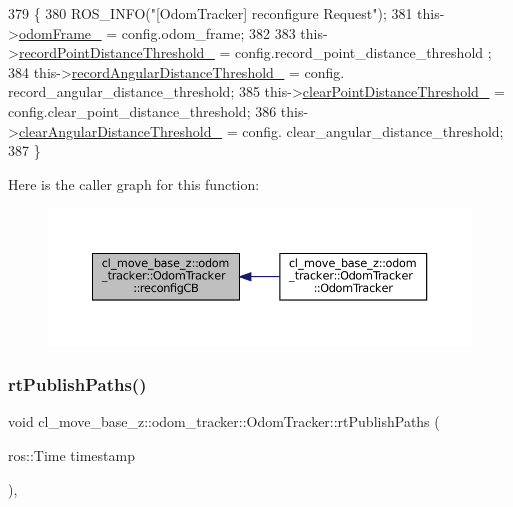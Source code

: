 \begin{DoxyCode}
379 \{
380   ROS\_INFO(\textcolor{stringliteral}{"[OdomTracker] reconfigure Request"});
381   this->\hyperlink{classcl__move__base__z_1_1odom__tracker_1_1OdomTracker_a54f31af5e74006560d94f266297853d4}{odomFrame\_} = config.odom\_frame;
382 
383   this->\hyperlink{classcl__move__base__z_1_1odom__tracker_1_1OdomTracker_a3a1173716d527bd182d04656491e01dd}{recordPointDistanceThreshold\_} = config.record\_point\_distance\_threshold
      ;
384   this->\hyperlink{classcl__move__base__z_1_1odom__tracker_1_1OdomTracker_a1274fe5334c109cd9c2339beb9411441}{recordAngularDistanceThreshold\_} = config.
      record\_angular\_distance\_threshold;
385   this->\hyperlink{classcl__move__base__z_1_1odom__tracker_1_1OdomTracker_a7155d25d0e8dd9f237a79ff503b80e26}{clearPointDistanceThreshold\_} = config.clear\_point\_distance\_threshold;
386   this->\hyperlink{classcl__move__base__z_1_1odom__tracker_1_1OdomTracker_a1b79dd86745adfb31db822e0c8106282}{clearAngularDistanceThreshold\_} = config.
      clear\_angular\_distance\_threshold;
387 \}
\end{DoxyCode}
Here is the caller graph for this function\+:
\nopagebreak
\begin{figure}[H]
\begin{center}
\leavevmode
\includegraphics[width=350pt]{classcl__move__base__z_1_1odom__tracker_1_1OdomTracker_adb06a17455b8d545034d8845706e2886_icgraph}
\end{center}
\end{figure}
\mbox{\label{classcl__move__base__z_1_1odom__tracker_1_1OdomTracker_a8f728f85d1f3f49f4b94e37052a59d6d}} 
\subsubsection{\texorpdfstring{rt\+Publish\+Paths()}{rtPublishPaths()}}
{\footnotesize\ttfamily void cl\+\_\+move\+\_\+base\+\_\+z\+::odom\+\_\+tracker\+::\+Odom\+Tracker\+::rt\+Publish\+Paths (\begin{DoxyParamCaption}\item[{ros\+::\+Time}]{timestamp }\end{DoxyParamCaption})\hspace{0.3cm}{\ttfamily [protected]}, {\ttfamily [virtual]}}

